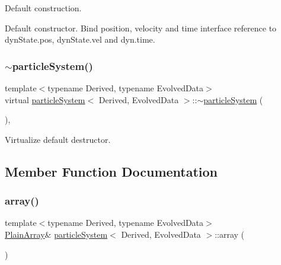 Default construction. 

Default constructor. Bind position, velocity and time interface reference to dyn\+State.\+pos, dyn\+State.\+vel and dyn.\+time. \mbox{\label{classparticle_system_a14ddda3c186e335eb989790db240dd94}} 
\subsubsection{\texorpdfstring{$\sim$particle\+System()}{~particleSystem()}}
{\footnotesize\ttfamily template$<$typename Derived, typename Evolved\+Data$>$ \\
virtual \mbox{\hyperlink{classparticle_system}{particle\+System}}$<$ Derived, Evolved\+Data $>$\+::$\sim$\mbox{\hyperlink{classparticle_system}{particle\+System}} (\begin{DoxyParamCaption}{ }\end{DoxyParamCaption})\hspace{0.3cm}{\ttfamily [inline]}, {\ttfamily [virtual]}}



Virtualize default destructor. 



\subsection{Member Function Documentation}
\mbox{\label{classparticle_system_a1817956f802188c82c12c223c32bd28a}} 
\subsubsection{\texorpdfstring{array()}{array()}}
{\footnotesize\ttfamily template$<$typename Derived, typename Evolved\+Data$>$ \\
\mbox{\hyperlink{classparticle_system_ae5a7215810a9f2cad5508aca6b26a063}{Plain\+Array}}\& \mbox{\hyperlink{classparticle_system}{particle\+System}}$<$ Derived, Evolved\+Data $>$\+::array (\begin{DoxyParamCaption}{ }\end{DoxyParamCaption})\hspace{0.3cm}{\ttfamily [inline]}}



